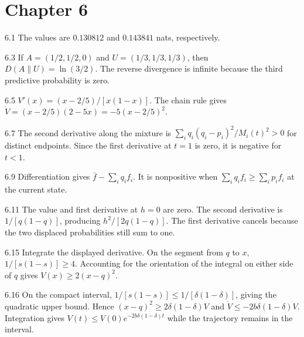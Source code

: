 \documentclass[11pt,oneside,openany]{book}
\theoremstyle{definition}
\theoremstyle{remark}
\newenvironment{answers}{\begin{description}[leftmargin=2.9em,labelwidth=2.5em,labelsep=.4em,itemsep=8pt,font=\normalfont\bfseries]}{\end{description}}
\numberwithin{equation}{chapter}
\begin{document}
\section*{Chapter 6}
\begin{answers}
\item[6.1] The values are $0.130812$ and $0.143841$ nats, respectively.
\item[6.3] If $A=(1/2,1/2,0)$ and $U=(1/3,1/3,1/3)$, then $D(A\|U)=\ln(3/2)$. The reverse divergence is infinite because the third predictive probability is zero.
\item[6.5] $V'(x)=(x-2/5)/[x(1-x)]$. The chain rule gives $\dot V=(x-2/5)(2-5x)=-5(x-2/5)^2$.
\item[6.7] The second derivative along the mixture is $\sum_iq_i(q_i-p_i)^2/M_i(t)^2>0$ for distinct endpoints. Since the first derivative at $t=1$ is zero, it is negative for $t<1$.
\item[6.9] Differentiation gives $\bar f-\sum_iq_if_i$. It is nonpositive when $\sum_iq_if_i\geq\sum_ip_if_i$ at the current state.
\item[6.11] The value and first derivative at $h=0$ are zero. The second derivative is $1/[q(1-q)]$, producing $h^2/[2q(1-q)]$. The first derivative cancels because the two displaced probabilities still sum to one.
\item[6.15] Integrate the displayed derivative. On the segment from $q$ to $x$, $1/[s(1-s)]\geq4$. Accounting for the orientation of the integral on either side of $q$ gives $V(x)\geq2(x-q)^2$.
\item[6.16] On the compact interval, $1/[s(1-s)]\leq1/[\delta(1-\delta)]$, giving the quadratic upper bound. Hence $(x-q)^2\geq2\delta(1-\delta)V$ and $\dot V\leq-2b\delta(1-\delta)V$. Integration gives $V(t)\leq V(0)e^{-2b\delta(1-\delta)t}$ while the trajectory remains in the interval.
\end{answers}
\end{document}
